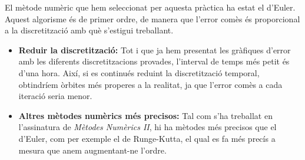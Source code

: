 \documentclass[10pt, twoside, a4paper]{article}
\begin{document}
El mètode numèric que hem seleccionat per aquesta pràctica ha estat el d'Euler. Aquest algorisme és de primer ordre, de manera que l'error comès és proporcional a la discretització amb què s'estigui treballant.
\begin{itemize}
    \item \textbf{Reduir la discretització: } Tot i que ja hem presentat les gràfiques d'error amb les diferents discretitzacions provades, l'interval de temps més petit és d'una hora. Així, si es continués reduint la discretització temporal, obtindríem òrbites més properes a la realitat, ja que l'error comès a cada iteració seria menor.
    \item \textbf{Altres mètodes numèrics més precisos: } Tal com s'ha treballat en l'assinatura de \textit{Mètodes Numèrics II}, hi ha mètodes més precisos que el d'Euler, com per exemple el de Runge-Kutta, el qual es fa més precís a mesura que anem augmentant-ne l'ordre.
\end{itemize}
\end{document}
